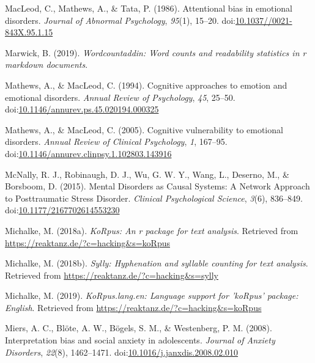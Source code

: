 \documentclass[man,floatsintext]{apa6}
\begin{document}
\leavevmode\hypertarget{ref-MacLeod1986}{}%
MacLeod, C., Mathews, A., \& Tata, P. (1986). Attentional bias in emotional disorders. \emph{Journal of Abnormal Psychology}, \emph{95}(1), 15--20. doi:\href{https://doi.org/10.1037//0021-843X.95.1.15}{10.1037//0021-843X.95.1.15}

\leavevmode\hypertarget{ref-R-wordcountaddin}{}%
Marwick, B. (2019). \emph{Wordcountaddin: Word counts and readability statistics in r markdown documents}.

\leavevmode\hypertarget{ref-Mathews1994}{}%
Mathews, A., \& MacLeod, C. (1994). Cognitive approaches to emotion and emotional disorders. \emph{Annual Review of Psychology}, \emph{45}, 25--50. doi:\href{https://doi.org/10.1146/annurev.ps.45.020194.000325}{10.1146/annurev.ps.45.020194.000325}

\leavevmode\hypertarget{ref-Mathews2005}{}%
Mathews, A., \& MacLeod, C. (2005). Cognitive vulnerability to emotional disorders. \emph{Annual Review of Clinical Psychology}, \emph{1}, 167--95. doi:\href{https://doi.org/10.1146/annurev.clinpsy.1.102803.143916}{10.1146/annurev.clinpsy.1.102803.143916}

\leavevmode\hypertarget{ref-McNally2011}{}%
McNally, R. J., Robinaugh, D. J., Wu, G. W. Y., Wang, L., Deserno, M., \& Borsboom, D. (2015). Mental Disorders as Causal Systems: A Network Approach to Posttraumatic Stress Disorder. \emph{Clinical Psychological Science}, \emph{3}(6), 836--849. doi:\href{https://doi.org/10.1177/2167702614553230}{10.1177/2167702614553230}

\leavevmode\hypertarget{ref-R-koRpus}{}%
Michalke, M. (2018a). \emph{KoRpus: An r package for text analysis}. Retrieved from \url{https://reaktanz.de/?c=hacking\&s=koRpus}

\leavevmode\hypertarget{ref-R-sylly}{}%
Michalke, M. (2018b). \emph{Sylly: Hyphenation and syllable counting for text analysis}. Retrieved from \url{https://reaktanz.de/?c=hacking\&s=sylly}

\leavevmode\hypertarget{ref-R-koRpus.lang.en}{}%
Michalke, M. (2019). \emph{KoRpus.lang.en: Language support for 'koRpus' package: English}. Retrieved from \url{https://reaktanz.de/?c=hacking\&s=koRpus}

\leavevmode\hypertarget{ref-miers_interpretation_2008}{}%
Miers, A. C., Blöte, A. W., Bögels, S. M., \& Westenberg, P. M. (2008). Interpretation bias and social anxiety in adolescents. \emph{Journal of Anxiety Disorders}, \emph{22}(8), 1462--1471. doi:\href{https://doi.org/10.1016/j.janxdis.2008.02.010}{10.1016/j.janxdis.2008.02.010}
\end{document}
